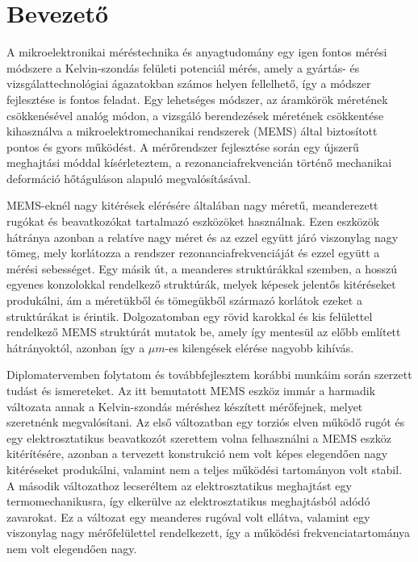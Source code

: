 \chapter{Bevezető}

A mikroelektronikai méréstechnika és anyagtudomány egy igen fontos mérési módszere a Kelvin-szondás felületi potenciál mérés\cite{Kelvin_desc}, amely a gyártás- és vizsgálattechnológiai ágazatokban számos helyen fellelhető, így a módszer fejlesztése is fontos feladat. Egy lehetséges módszer, az áramkörök méretének csökkenésével analóg módon, a vizsgáló berendezések méretének csökkentése kihasználva a mikroelektromechanikai rendszerek (MEMS) által biztosított pontos és gyors működést. A mérőrendszer fejlesztése során egy újszerű meghajtási móddal kísérleteztem, a rezonanciafrekvencián történő mechanikai deformáció hőtáguláson alapuló megvalósításával.

MEMS-eknél nagy kitérések elérésére általában nagy méretű, meanderezett rugókat és beavatkozókat tartalmazó eszközöket használnak\cite{micromirror}\cite{large_out_of_plane}. Ezen eszközök hátránya azonban a relatíve nagy méret és az ezzel együtt járó viszonylag nagy tömeg, mely korlátozza a rendszer rezonanciafrekvenciáját és ezzel együtt a mérési sebességet. Egy másik út, a meanderes struktúrákkal szemben, a hosszú egyenes konzolokkal rendelkező struktúrák, melyek képesek jelentős kitéréseket produkálni\cite{brai}, ám a méretükből és tömegükből származó korlátok ezeket a struktúrákat is érintik. Dolgozatomban egy rövid karokkal és kis felülettel rendelkező MEMS struktúrát mutatok be, amely így mentesül az előbb említett hátrányoktól, azonban így a $\mu m$-es kilengések elérése nagyobb kihívás.

Diplomatervemben folytatom és továbbfejlesztem korábbi munkáim\cite{bsc}\cite{tdk2020} során szerzett tudást és ismereteket. Az itt bemutatott MEMS eszköz immár a harmadik változata annak a Kelvin-szondás méréshez készített mérőfejnek, melyet szeretnénk megvalósítani. Az első változatban\cite{bsc} egy torziós elven működő rugót és egy elektrosztatikus beavatkozót szerettem volna felhasználni a MEMS eszköz kitérítésére, azonban a tervezett konstrukció nem volt képes elegendően nagy kitéréseket produkálni, valamint nem a teljes működési tartományon volt stabil\cite{bsc_instability}. A második változathoz\cite{tdk2020} lecseréltem az elektrosztatikus meghajtást egy termomechanikusra, így elkerülve az elektrosztatikus meghajtásból adódó zavarokat. Ez a változat egy meanderes rugóval volt ellátva, valamint egy viszonylag nagy mérőfelülettel rendelkezett, így a működési frekvenciatartománya nem volt elegendően nagy.

